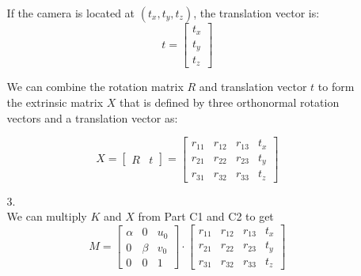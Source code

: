 \documentclass[12pt]{report}
\begin{document}
\begin{enumerate}
\begin{enumerate}
    If the camera is located at \( (t_x, t_y, t_z) \), the translation vector is:
    $$
    t = \begin{bmatrix}
    t_x \\
    t_y \\
    t_z
    \end{bmatrix}
    $$

    We can combine the rotation matrix \( R \) and translation vector \( t \) to form the extrinsic matrix \( X \) that is defined by three orthonormal rotation vectors and a 
    translation vector as:

    $$
    X = \begin{bmatrix}
    R & t
    \end{bmatrix}
    =
    \begin{bmatrix}
    r_{11} & r_{12} & r_{13} & t_x \\
    r_{21} & r_{22} & r_{23} & t_y \\
    r_{31} & r_{32} & r_{33} & t_z
    \end{bmatrix}
    $$
    
    \item[3.]
    \ \\
    We can multiply $K$ and $X$ from Part C1 and C2 to get 
    $$
    M = \begin{bmatrix}
    \alpha & 0 & u_0 \\
    0 & \beta & v_0 \\
    0 & 0 & 1
    \end{bmatrix}
    \cdot
    \begin{bmatrix}
    r_{11} & r_{12} & r_{13} & t_x \\
    r_{21} & r_{22} & r_{23} & t_y \\
    r_{31} & r_{32} & r_{33} & t_z
    \end{bmatrix}
    $$


\end{enumerate}
\end{enumerate}
\end{document}
